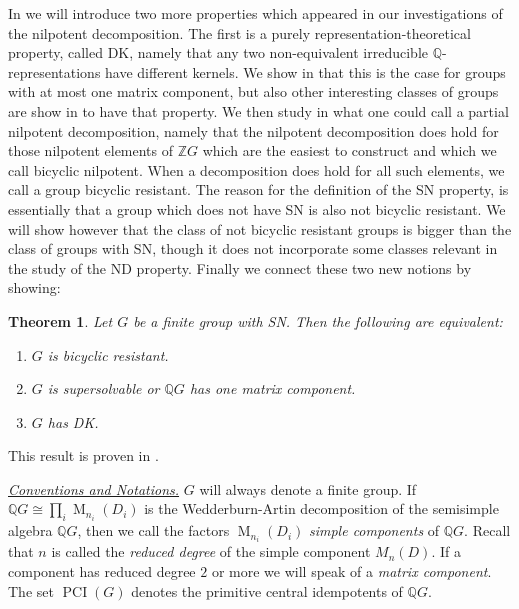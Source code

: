 \documentclass[a4paper,10pt]{amsart}
\newtheorem{maintheorem}{Theorem}
\theoremstyle{definition}
\theoremstyle{remark}
\newcommand{\Ma}{\operatorname{M}}
\newcommand\PCI{\operatorname{PCI}}
\newcommand{\Q}{{\mathbb Q}}
\begin{document}
In  we will introduce two more properties which appeared in our investigations of the nilpotent decomposition. The first is a purely representation-theoretical property, called DK, namely that any two non-equivalent irreducible $\Q$-representations have different kernels. We show in  that this is the case for groups with at most one matrix component, but also other interesting classes of groups are show in  to have that property. We then study in  what one could call a partial nilpotent decomposition, namely that the nilpotent decomposition does hold for those nilpotent elements of $\mathbb{Z}G$ which are the easiest to construct and which we call bicyclic nilpotent. When a decomposition does hold for all such elements, we call a group bicyclic resistant. The reason for the definition of the SN property, is essentially that a group which does not have SN is also not bicyclic resistant. We will show however that the class of not bicyclic resistant groups is bigger than the class of groups with SN, though it does not incorporate some classes relevant in the study of the ND property.
Finally we connect these two new notions by showing:

\begin{maintheorem}
Let $G$ be a finite group with SN. Then the following are equivalent:
\begin{enumerate}
\item $G$ is bicyclic resistant.
\item $G$ is supersolvable or $\Q G$ has one matrix component.
\item $G$ has DK.
\end{enumerate}
\end{maintheorem}
\noindent This result is proven in .

\vspace*{.5cm}
\noindent \underline{\it Conventions and Notations.} $G$ will always denote a finite group. If $\Q G \cong \prod_{i} \Ma_{n_i}(D_i)$ is the Wedderburn-Artin decomposition of the semisimple algebra $\Q G$, then we call the factors $\Ma_{n_i}(D_i)$ \emph{simple components} of $\Q G$. Recall that $n$ is called the \emph{reduced degree} of the simple component $M_n(D)$. If a component has reduced degree $2$ or more we will speak of a \emph{matrix component}. The set $\PCI(G)$ denotes the primitive central idempotents of $\Q G$. 
\end{document}
